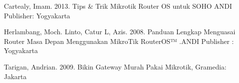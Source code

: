 \documentclass{jtetiproposalskripsi}
\begin{document}
\begin{thebibliography}{9}


Cartealy, Imam. 2013. Tips \& Trik Mikrotik Router OS untuk SOHO ANDI Publisher: Yogyakarta


Herlambang, Moch. Linto, Catur L, Azis. 2008. Panduan Lengkap Menguasai Router   Masa   Depan   Menggunakan   MikroTik   RouterOS™   .ANDI Publisher : Yogyakarta

Tarigan, Andrian. 2009. Bikin Gateway Murah Pakai Mikrotik, Gramedia: Jakarta


\end{thebibliography}
\end{document}

